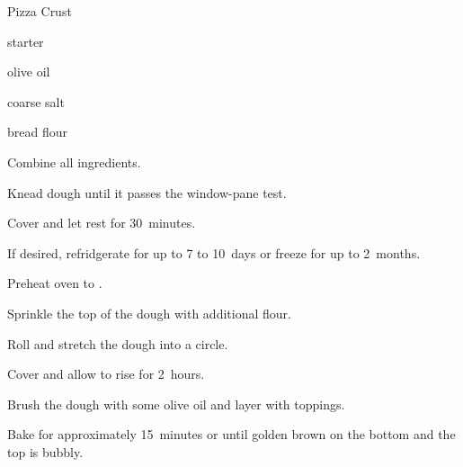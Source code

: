 \begin{recipe}{Pizza Crust}{}{}

\begin{ingredients}
\item \C{1\half} starter
\item {} olive oil
\item {} coarse salt
\item \C{1\half} bread flour
\end{ingredients}

\begin{directions}
\item Combine all ingredients.
\item Knead dough until it passes the window-pane test.
\item Cover and let rest for 30~minutes.
\item If desired, refridgerate for up to 7 to 10~days or freeze for up to 2~months.
\item Preheat oven to .
\item Sprinkle the top of the dough with additional flour.
\item Roll and stretch the dough into a circle.
\item Cover and allow to rise for 2~hours.
\item Brush the dough with some olive oil and layer with toppings.
\item Bake for approximately 15~minutes or until golden brown on the bottom and the top is bubbly.
\end{directions}
\end{recipe}
